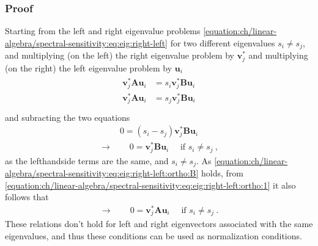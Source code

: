 \documentclass[letterpaper,10pt,english]{jupyterBook}
\begin{document}
\subsubsection*{Proof}

\sphinxAtStartPar
Starting from the left and right eigenvalue problems \eqref{equation:ch/linear-algebra/spectral-sensitivity:eq:eig:right-left} for two different eigenvalues \(s_i \ne s_j\), and multiplying (on the left) the right eigenvalue problem by \(\mathbf{v}_j^*\) and multiplying (on the right) the left eigenvalue problem by \(\mathbf{u}_i\)
\begin{equation}\label{equation:ch/linear-algebra/spectral-sensitivity:eq:eig:right-left:ortho:1}
\begin{split}\begin{aligned}
  \mathbf{v}_j^* \mathbf{A} \mathbf{u}_i & = s_i \mathbf{v}_j^* \mathbf{B} \mathbf{u}_i \\
  \mathbf{v}_j^* \mathbf{A} \mathbf{u}_i & = s_j \mathbf{v}_j^* \mathbf{B} \mathbf{u}_i \\
\end{aligned}\end{split}
\end{equation}
\sphinxAtStartPar
and subracting the two equations
\begin{equation*}
\begin{split}0 = (s_i - s_j) \mathbf{v}_j^* \mathbf{B} \mathbf{u}_i\end{split}
\end{equation*}\begin{equation}\label{equation:ch/linear-algebra/spectral-sensitivity:eq:eig:right-left:ortho:B}
\begin{split}\rightarrow \qquad 0 = \mathbf{v}_j^* \mathbf{B} \mathbf{u}_i \quad \text{ if $s_i \ne s_j$} \ ,\end{split}
\end{equation}
\sphinxAtStartPar
as the left\sphinxhyphen{}hand\sphinxhyphen{}side terms are the same, and \(s_i \ne s_j\). As \eqref{equation:ch/linear-algebra/spectral-sensitivity:eq:eig:right-left:ortho:B} holds, from \eqref{equation:ch/linear-algebra/spectral-sensitivity:eq:eig:right-left:ortho:1} it also follows that
\begin{equation}\label{equation:ch/linear-algebra/spectral-sensitivity:eq:eig:right-left:ortho:A}
\begin{split}\rightarrow \qquad 0 = \mathbf{v}_j^* \mathbf{A} \mathbf{u}_i \quad \text{ if $s_i \ne s_j$} \ .\end{split}
\end{equation}
\sphinxAtStartPar
These relations don’t hold for left and right eigenvectors associated with the same eigenvalues, and thus these conditions can be used as normalization conditions.
\end{document}
